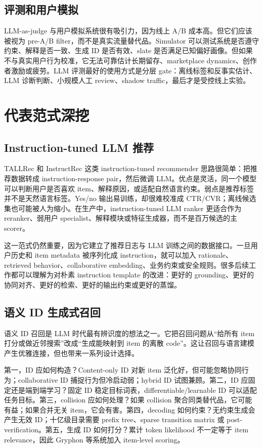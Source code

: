 \documentclass[UTF8,fontset=fandol,11pt]{ctexart}
\begin{document}
\subsection{评测和用户模拟}

LLM-as-judge 与用户模拟系统很有吸引力，因为线上 A/B 成本高。但它们应该被视为 pre-A/B filter，而不是真实流量替代品。Simulator 可以测试系统是否遵守约束、解释是否一致、生成 ID 是否有效、slate 是否满足已知偏好画像。但如果不与真实用户行为校准，它无法可靠估计长期留存、marketplace dynamics、创作者激励或疲劳。LLM 评测最好的使用方式是分层 gate：离线标签和反事实估计、LLM 诊断判断、小规模人工 review、shadow traffic，最后才是受控线上实验。

\section{代表范式深挖}

\subsection{Instruction-tuned LLM 推荐}

TALLRec 和 InstructRec 这类 instruction-tuned recommender 思路很简单：把推荐数据转成 instruction-response pair，然后微调 LLM。优点是灵活，同一个模型可以判断用户是否喜欢 item、解释原因，或适配自然语言约束。弱点是推荐标签并不是天然语言标签。Yes/no 输出易训练，却很难校准成 CTR/CVR；离线候选集也可能被人为缩小。在生产中，instruction-tuned LLM ranker 更适合作为 reranker、弱用户 specialist、解释模块或特征生成器，而不是百万候选的主 scorer。

这一范式仍然重要，因为它建立了推荐日志与 LLM 训练之间的数据接口。一旦用户历史和 item metadata 被序列化成 instruction，就可以加入 rationale、retrieved behavior、collaborative embedding、业务约束或安全规则。很多后续工作都可以理解为对朴素 instruction template 的改进：更好的 grounding、更好的协同对齐、更好的检索、更好的输出约束或更好的蒸馏。

\subsection{语义 ID 生成式召回}

语义 ID 召回是 LLM 时代最有辨识度的想法之一。它把召回问题从“给所有 item 打分或做近邻搜索”改成“生成能映射到 item 的离散 code”。这让召回与语言建模产生优雅连接，但也带来一系列设计选择。

第一，ID 应如何构造？Content-only ID 对新 item 泛化好，但可能忽略协同行为；collaborative ID 捕捉行为但冷启动弱；hybrid ID 试图兼顾。第二，ID 应固定还是端到端学习？固定 ID 稳定目标词表，differentiable/learnable ID 可以适配任务目标。第三，collision 应如何处理？如果 collision 聚合同类替代品，它可能有益；如果合并无关 item，它会有害。第四，decoding 如何约束？无约束生成会产生无效 ID；十亿级目录需要 prefix tree、sparse transition matrix 或 post-verification。第五，生成 ID 如何打分？累计 token likelihood 不一定等于 item relevance，因此 Gryphon 等系统加入 item-level scoring。
\end{document}
